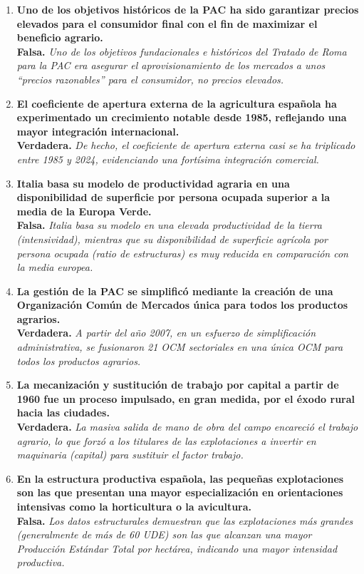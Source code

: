 \begin{enumerate}[label=\textbf{\arabic*.}]
    \item \textbf{Uno de los objetivos históricos de la PAC ha sido garantizar precios elevados para el consumidor final con el fin de maximizar el beneficio agrario.} \\
    \textbf{Falsa.} \textit{Uno de los objetivos fundacionales e históricos del Tratado de Roma para la PAC era asegurar el aprovisionamiento de los mercados a unos ``precios razonables'' para el consumidor, no precios elevados.}

    \item \textbf{El coeficiente de apertura externa de la agricultura española ha experimentado un crecimiento notable desde 1985, reflejando una mayor integración internacional.} \\
    \textbf{Verdadera.} \textit{De hecho, el coeficiente de apertura externa casi se ha triplicado entre 1985 y 2024, evidenciando una fortísima integración comercial.}

    \item \textbf{Italia basa su modelo de productividad agraria en una disponibilidad de superficie por persona ocupada superior a la media de la Europa Verde.} \\
    \textbf{Falsa.} \textit{Italia basa su modelo en una elevada productividad de la tierra (intensividad), mientras que su disponibilidad de superficie agrícola por persona ocupada (ratio de estructuras) es muy reducida en comparación con la media europea.}

    \item \textbf{La gestión de la PAC se simplificó mediante la creación de una Organización Común de Mercados única para todos los productos agrarios.} \\
    \textbf{Verdadera.} \textit{A partir del año 2007, en un esfuerzo de simplificación administrativa, se fusionaron 21 OCM sectoriales en una única OCM para todos los productos agrarios.}

    \item \textbf{La mecanización y sustitución de trabajo por capital a partir de 1960 fue un proceso impulsado, en gran medida, por el éxodo rural hacia las ciudades.} \\
    \textbf{Verdadera.} \textit{La masiva salida de mano de obra del campo encareció el trabajo agrario, lo que forzó a los titulares de las explotaciones a invertir en maquinaria (capital) para sustituir el factor trabajo.}

    \item \textbf{En la estructura productiva española, las pequeñas explotaciones son las que presentan una mayor especialización en orientaciones intensivas como la horticultura o la avicultura.} \\
    \textbf{Falsa.} \textit{Los datos estructurales demuestran que las explotaciones más grandes (generalmente de más de 60 UDE) son las que alcanzan una mayor Producción Estándar Total por hectárea, indicando una mayor intensidad productiva.}


\end{enumerate}
